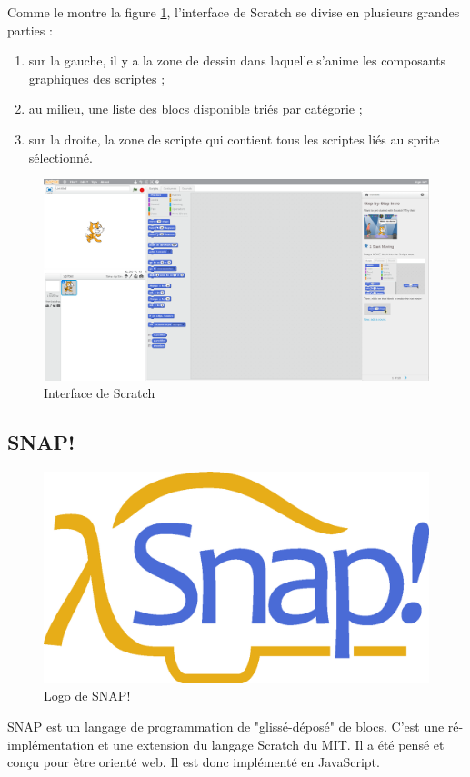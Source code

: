 Comme le montre la figure \ref{fig:scratch-printscreen}, l'interface de Scratch se divise en plusieurs grandes parties :

\begin{enumerate}
\item sur la gauche, il y a la zone de dessin dans laquelle s'anime les composants graphiques des scriptes ;
\item au milieu, une liste des blocs disponible triés par catégorie ;
\item sur la droite, la zone de scripte qui contient tous les scriptes liés au sprite sélectionné.
\end{enumerate}
\begin{figure}[]
  \begin{center}
    \includegraphics[width=\textwidth]{content/5-related_work/images/scratch-printscreen}
    \caption{Interface de Scratch}
    \label{fig:scratch-printscreen}
  \end{center}
\end{figure}

\subsection{SNAP!}
\begin{figure}[!h]
  \begin{center}
    \includegraphics[scale=0.07]{content/5-related_work/images/snap}
    \caption{Logo de SNAP!}
    \label{fig:snap}
  \end{center}
\end{figure}
SNAP est un langage de programmation de "glissé-déposé" de blocs. C'est une ré-implémentation et une extension du langage Scratch du MIT. Il a été pensé et conçu pour être orienté web. Il est donc implémenté en JavaScript.\\

